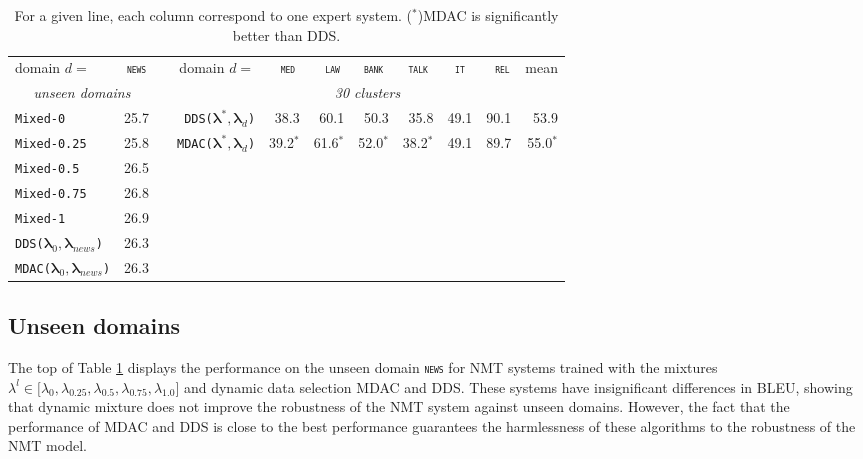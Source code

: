 \documentclass[11pt]{article}
\newcommand{\domain}[1]{\texttt{\textsc{#1}}}
\newcommand{\system}[1]{\texttt{{#1}}}
\newcommand{\vlambda}{\ensuremath{\boldsymbol\lambda}\xspace} %
\begin{document}
\begin{table}[htbp]
  \centering \small
  \begin{tabular}{|l|*{10}{r|}} \cline{1-2} \cline{4-11}
    domain \hfill $d=$ & \multicolumn{1}{c|}{\domain{news}}& \hfill &domain \hfill $d=$ & \multicolumn{1}{c|}{\domain{ med}} & \multicolumn{1}{c|}{\domain{ law}} & \multicolumn{1}{c|}{\domain{bank}} & \multicolumn{1}{c|}{\domain{talk}} & \multicolumn{1}{c|}{\domain{ it }} & \multicolumn{1}{c|}{\domain{ rel}} & \multicolumn{1}{c|}{mean}  \\ 
\cline{1-2} \cline{4-11}
    \multicolumn{2}{|c|}{\sl unseen domains} & &\multicolumn{8}{c|}{\sl 30 clusters} \\ 
\cline{1-2} \cline{4-11}
    \system{Mixed-0}      & 25.7 & &\system{DDS($\vlambda^*, \vlambda_d$)}&38.3&60.1&50.3&35.8&49.1&90.1&53.9\\
    \system{Mixed-0.25} & 25.8 & &\system{MDAC($\vlambda^*, \vlambda_d$)}&39.2$^*$&61.6$^*$&52.0$^*$&38.2$^*$&49.1&89.7&55.0$^*$\\ \cline{4-11}
    \system{Mixed-0.5}   &26.5\\
    \system{Mixed-0.75} &26.8\\
    \system{Mixed-1} &26.9 \\
    \cline{1-2}
     \system{DDS($\vlambda_0, \vlambda_{news}$)} &26.3 \\
     \system{MDAC($\vlambda_0, \vlambda_{news}$)} &26.3 \\
     \cline{1-2}
  \end{tabular}
  \caption{For a given line, each column correspond to one expert system. ($^*$)MDAC is significantly better than DDS.}
  \label{tab:unsupervised-da}
\end{table}

\subsection{Unseen domains}\label{ssec:uda}
The top of Table \ref{tab:unsupervised-da} displays the performance on the unseen domain \domain{news} for NMT systems trained with the mixtures $\lambda^l \in \big[ \lambda_0, \lambda_{0.25}, \lambda_{0.5}, \lambda_{0.75}, \lambda_{1.0}\big]$ and dynamic data selection MDAC and DDS. These systems have insignificant differences in BLEU, showing that dynamic mixture does not improve the robustness of the NMT system against unseen domains. However, the fact that the performance of MDAC and DDS is close to the best performance guarantees the harmlessness of these algorithms to the robustness of the NMT model.
\end{document}

